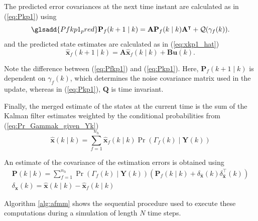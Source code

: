 The predicted error covariances at the next time instant are calculated as in (\ref{eq:Pkp1}) using
\begin{equation} \label{eq:Pfkp1} \glsadd{Pfkp1_pred}
	\mathbf{P}_f(k+1 \mid k) = \mathbf{A} \mathbf{P}_f(k \mid k)  \mathbf{A}^\intercal  + \mathcal{Q}(\gamma_f(k)).
\end{equation}
and the predicted state estimates are calculated as in (\ref{eq:xkp1_hat})
\begin{equation} \label{eq:xfkp1_hat}
	\mathbf{\hat{x}}_f(k+1 \mid k) = \mathbf{A} \mathbf{\hat{x}}_f(k \mid k) + \mathbf{B} \mathbf{u}(k).
\end{equation}

Note the difference between (\ref{eq:Pfkp1}) and (\ref{eq:Pkp1}).  Here, $\mathbf{P}_f(k+1 \mid k)$ is dependent on $\gamma_f(k)$, which determines the noise covariance matrix used in the update, whereas in (\ref{eq:Pkp1}), $\mathbf{Q}$ is time invariant.

Finally, the merged estimate of the states at the current time is the sum of the Kalman filter estimates weighted by the conditional probabilities from (\ref{eq:Pr_Gammak_given_Yk})
\begin{equation} \label{eq:xk_hat}
	\mathbf{\hat{x}}(k \mid k) = \sum_{f=1}^{n_h} \mathbf{\hat{x}}_f(k \mid k) \Pr(\Gamma_f(k) \mid \mathbf{Y}(k))
\end{equation}

An estimate of the covariance of the estimation errors is obtained using
\begin{equation} \label{eq:P_hat}
	\begin{aligned}
	\mathbf{P}(k \mid k) = \sum_{f=1}^{n_h} \Pr(\Gamma_f(k) \mid \mathbf{Y}(k)) \left( \mathbf{P}_f(k \mid k) + \delta_\mathbf{\hat{x}}(k) \delta_\mathbf{\hat{x}}^\intercal(k) \right) \\
	\delta_\mathbf{\hat{x}}(k) = \mathbf{\hat{x}}(k \mid k) - \mathbf{\hat{x}}_f(k \mid k)
	\end{aligned}
\end{equation}


Algorithm \ref{alg:afmm} shows the sequential procedure used to execute these computations during a simulation of length $N$ time steps.

